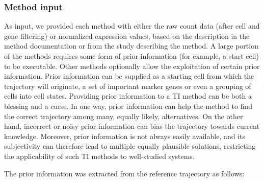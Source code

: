 \subsubsection{Method input}

As input, we provided each method with either the raw count data (after cell and gene filtering) or normalized expression values, based on the description in the method documentation or from the study describing the method. A large portion of the methods requires some form of prior information (for example, a start cell) to be executable. Other methods optionally allow the exploitation of certain prior information. Prior information can be supplied as a starting cell from which the trajectory will originate, a set of important marker genes or even a grouping of cells into cell states. Providing prior information to a TI method can be both a blessing and a curse. In one way, prior information can help the method to find the correct trajectory among many, equally likely, alternatives. On the other hand, incorrect or noisy prior information can bias the trajectory towards current knowledge. Moreover, prior information is not always easily available, and its subjectivity can therefore lead to multiple equally plausible solutions, restricting the applicability of such TI methods to well-studied systems.


The prior information was extracted from the reference trajectory as follows:

